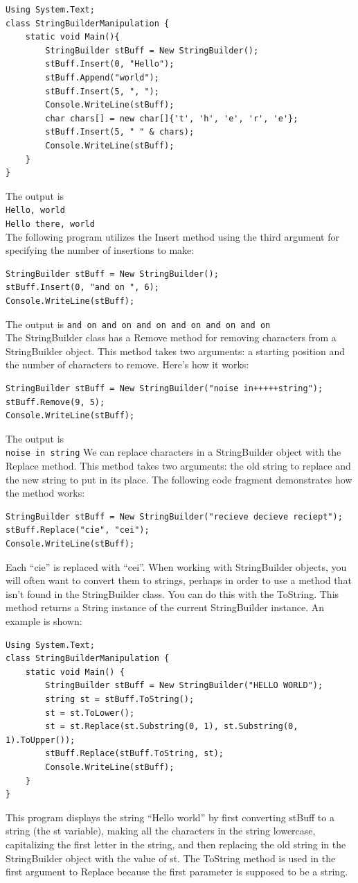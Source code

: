 \documentclass[12pt,a4paper,final,twoside,titlepage]{book}
\begin{document}
\begin{lstlisting}
Using System.Text; 
class StringBuilderManipulation {
	static void Main(){
		StringBuilder stBuff = New StringBuilder(); 
		stBuff.Insert(0, "Hello");
		stBuff.Append("world");
		stBuff.Insert(5, ", ");
		Console.WriteLine(stBuff);
		char chars[] = new char[]{'t', 'h', 'e', 'r', 'e'}; 
		stBuff.Insert(5, " " & chars); 
		Console.WriteLine(stBuff);
	}
}
\end{lstlisting}
The output is\\
\texttt{Hello, world}\\
\texttt{Hello there, world}\\
The following program utilizes the Insert method using the third argument for specifying the number of insertions to make:
\begin{lstlisting}
StringBuilder stBuff = New StringBuilder();
stBuff.Insert(0, "and on ", 6);
Console.WriteLine(stBuff);
\end{lstlisting}
The output is
\texttt{and on and on and on and on and on and on}\\
The StringBuilder class has a Remove method for removing characters from a StringBuilder object. This method takes two arguments: a starting position and the number of characters to remove. Here’s how it works:
\begin{lstlisting}
StringBuilder stBuff = New StringBuilder("noise in+++++string");
stBuff.Remove(9, 5);
Console.WriteLine(stBuff);
\end{lstlisting}
The output is\\
\texttt{noise in string}
We can replace characters in a StringBuilder object with the Replace method. This method takes two arguments: the old string to replace and the new string to put in its place. The following code fragment demonstrates how the method works:
\begin{lstlisting}
StringBuilder stBuff = New StringBuilder("recieve decieve reciept");
stBuff.Replace("cie", "cei");
Console.WriteLine(stBuff);
\end{lstlisting}
Each “cie” is replaced with “cei”.
When working with StringBuilder objects, you will often want to convert them to strings, perhaps in order to use a method that isn’t found in the StringBuilder class. You can do this with the ToString. This method returns a String instance of the current StringBuilder instance. An example is shown:
\begin{lstlisting}
Using System.Text; 
class StringBuilderManipulation {
	static void Main() { 
		StringBuilder stBuff = New StringBuilder("HELLO WORLD");
      	string st = stBuff.ToString();
      	st = st.ToLower();
      	st = st.Replace(st.Substring(0, 1), st.Substring(0, 1).ToUpper());
      	stBuff.Replace(stBuff.ToString, st);
      	Console.WriteLine(stBuff);
	} 
}
\end{lstlisting}
This program displays the string “Hello world” by first converting stBuff to a string (the st variable), making all the characters in the string lowercase, capitalizing the first letter in the string, and then replacing the old string in the StringBuilder object with the value of st. The ToString method is used in the first argument to Replace because the first parameter is supposed to be a string. 
\end{document}
